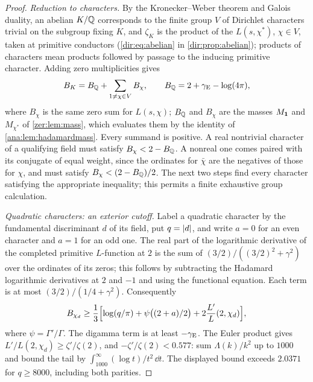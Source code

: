 \begin{proof}
\emph{Reduction to characters.} By the Kronecker--Weber theorem and Galois duality, an abelian
$K/\mathbb{Q}$ corresponds to the finite group $V$ of Dirichlet characters trivial on the subgroup
fixing $K$, and $\zeta_K$ is the product of the $L(s,\chi^*)$, $\chi\in V$, taken at primitive
conductors (\eqref{dir:eq:abelian} in \cref{dir:prop:abelian}); products of characters mean
products followed by passage to the inducing primitive character. Adding zero multiplicities
gives
\begin{equation}\label{zer:eq:BKsum}
 B_K=B_{\mathbb{Q}}+\sum_{1\ne\chi\in V}B_\chi,\qquad B_{\mathbb{Q}}=2+\gamma_{\mathrm{E}}-\log(4\pi),
\end{equation}
where $B_\chi$ is the same zero sum for $L(s,\chi)$; $B_{\mathbb{Q}}$ and $B_\chi$ are the masses
$M_{\mathbf{1}}$ and $M_{\chi^*}$ of \cref{zer:lem:mass}, which evaluates them by the identity of
\cref{ana:lem:hadamardmass}. Every summand is positive. A real nontrivial character of a qualifying field must satisfy
$B_\chi<2-B_{\mathbb{Q}}$. A nonreal one comes paired with its conjugate of equal weight, since the
ordinates for $\bar\chi$ are the negatives of those for $\chi$, and must satisfy
$B_\chi<(2-B_{\mathbb{Q}})/2$. The next two steps find every character satisfying the appropriate
inequality; this permits a finite exhaustive group calculation.

\emph{Quadratic characters: an exterior cutoff.} Label a quadratic character by the
fundamental discriminant $d$ of its field, put $q=\lvert d\rvert$, and write $a=0$ for an even
character and $a=1$ for an odd one. The real part of the logarithmic derivative of the
completed primitive $L$-function at $2$ is the sum of $(3/2)/((3/2)^2+\gamma^2)$ over the
ordinates of its zeros; this follows by subtracting the Hadamard logarithmic derivatives at
$2$ and $-1$ and using the functional equation. Each term is at most
$(3/2)/(1/4+\gamma^2)$. Consequently
\[
 B_{\chi_d}\ge\frac13\Bigl[\log(q/\pi)+\psi\bigl((2+a)/2\bigr)+2\frac{L'}L(2,\chi_d)\Bigr],
\]
where $\psi=\Gamma'/\Gamma$. The digamma term is at least $-\gamma_{\mathrm{E}}$. The Euler product
gives $L'/L(2,\chi_d)\ge\zeta'/\zeta(2)$, and $-\zeta'/\zeta(2)<0.577$: sum
$\Lambda(k)/k^2$ up to $1000$ and bound the tail by
$\int_{1000}^\infty(\log t)/t^2\,\dd t$.
The displayed bound exceeds $2.0371$ for $q\ge8000$, including both parities.


\end{proof}
